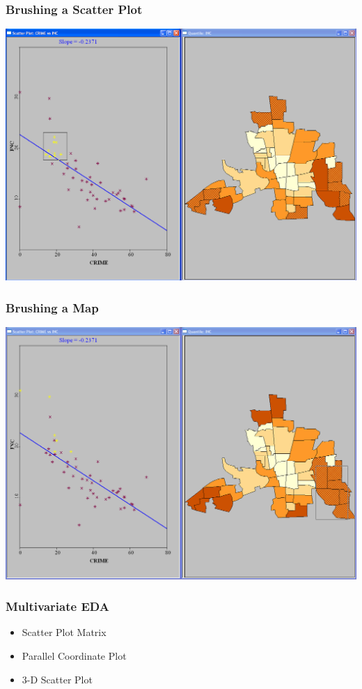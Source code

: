 \documentclass[nototal]{beamer}
\begin{document}
\begin{frame}
	\frametitle{Brushing a  Scatter Plot}
 \begin{center}
 \includegraphics[width=.85\linewidth]{brushspgeoda.png}
  \end{center}
 \end{frame} 

\begin{frame}
	\frametitle{Brushing a  Map}
 \begin{center}
 \includegraphics[width=.85\linewidth]{brushmapgeoda.png}
  \end{center}
 \end{frame} 

\begin{frame}
	\frametitle{Multivariate EDA}
 \begin{itemize}
 \item  Scatter Plot Matrix
 \item  Parallel Coordinate Plot
 \item  3-D Scatter Plot
 \end{itemize}
 \end{frame} 
\end{document}
